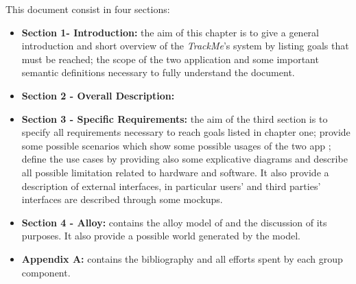 This document consist in four sections:\par
\begin{itemize}
	\item \textbf{Section 1- Introduction:} the aim of this chapter is to give a general introduction and short overview of the \textit{TrackMe}'s system by listing goals that must be reached; the scope of the two application and some important semantic definitions necessary to 			fully understand the document.  
	\item \textbf{Section 2 - Overall Description:} 
	\item \textbf{Section 3 - Specific Requirements:} the aim of the third section is to specify all requirements necessary to reach goals listed in chapter one; provide some possible scenarios which show some possible usages of the two app ; define the use cases by providing also 		some explicative diagrams and describe all possible limitation related to hardware and software. It also provide a description of external interfaces, in particular users' and third parties' interfaces are described through some mockups.
	\item \textbf{Section 4 - Alloy:} contains the alloy model of and the discussion of its purposes. It also provide a possible world generated by the model.
	\item \textbf{Appendix A:} contains the bibliography and all efforts spent by each group component. 
\end{itemize}